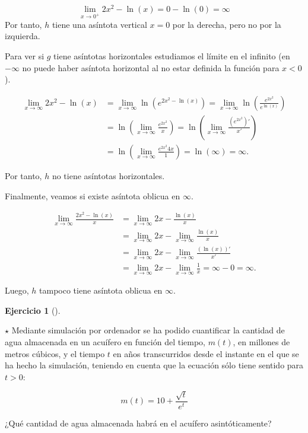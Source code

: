 \documentclass[
  a4paper,
]{scrreport}
\theoremstyle{definition}
\newtheorem{exercise}{Ejercicio}[chapter]
\theoremstyle{remark}
\begin{document}
\begin{tcolorbox}
\begin{enumerate}
  \[
   \lim_{x\to 0^+} 2x^2-\ln(x) = 0-\ln(0) = \infty
   \] Por tanto, \(h\) tiene una asíntota vertical \(x=0\) por la
  derecha, pero no por la izquierda.

  Para ver si \(g\) tiene asíntotas horizontales estudiamos el límite en
  el infinito (en \(-\infty\) no puede haber asíntota horizontal al no
  estar definida la función para \(x<0\)).

  \begin{align*}
   \lim_{x\to\infty} 2x^2-\ln(x) &= \lim_{x\to\infty}\ln(e^{2x^2-\ln(x)}) = \lim_{x\to \infty} \ln\left(\frac{e^{2x^2}}{e^{\ln(x)}}\right)\\ 
   &= \ln\left(\lim_{x\to \infty} \frac{e^{2x^2}}{x}\right) = \ln\left(\lim_{x\to \infty} \frac{(e^{2x^2})'}{x'}\right) \tag{L'Hôpital} \\ 
   &= \ln\left(\lim_{x\to \infty} \frac{e^{2x^2}4x}{1}\right) = \ln(\infty) = \infty.
   \end{align*}

  Por tanto, \(h\) no tiene asíntotas horizontales.

  Finalmente, veamos si existe asíntota oblicua en \(\infty\).

  \begin{align*}
   \lim_{x\to\infty} \frac{2x^2-\ln(x)}{x} &= \lim_{x\to \infty} 2x - \frac{\ln(x)}{x}\\ 
   & = \lim_{x\to \infty} 2x -\lim_{x\to \infty}\frac{\ln(x)}{x}\\ 
   &= \lim_{x\to \infty} 2x -\lim_{x\to \infty}\frac{(\ln(x))'}{x'} \tag{L'Hôpital}\\ 
   & = \lim_{x\to \infty} 2x -\lim_{x\to \infty}\frac{1}{x}= \infty-0=\infty.  
   \end{align*}

  Luego, \(h\) tampoco tiene asíntota oblicua en \(\infty\).
\end{enumerate}

\end{tcolorbox}

\leavevmode{}%
\begin{exercise}[]\label{exr-acuifero}

\(\star\) Mediante simulación por ordenador se ha podido cuantificar la
cantidad de agua almacenada en un acuífero en función del tiempo,
\(m(t)\), en millones de metros cúbicos, y el tiempo \(t\) en años
transcurridos desde el instante en el que se ha hecho la simulación,
teniendo en cuenta que la ecuación sólo tiene sentido para \(t>0\):

\[
m(t) = 10 + \frac{\sqrt{t}}{e^t}
\]

¿Qué cantidad de agua almacenada habrá en el acuífero asintóticamente?

\end{exercise}
\end{document}
